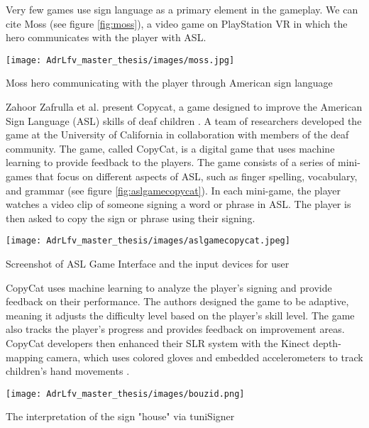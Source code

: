 Very few games use sign language as a primary element in the gameplay. We can cite Moss \cite{moss2018} (see figure \ref{fig:moss}), a video game on PlayStation VR in which the hero communicates with the player with ASL. 

\begin{marginfigure}
    \centering
    \texttt{[image: AdrLfv\_master\_thesis/images/moss.jpg]}
    \caption{Moss hero communicating with the player through American sign language}
    \label{fig:moss}
\end{marginfigure}

Zahoor Zafrulla et al. present Copycat, a game designed to improve the American Sign Language (ASL) skills of deaf children \cite{zafrulla2011copycat}. A team of researchers developed the game at the University of California in collaboration with members of the deaf community.
The game, called CopyCat, is a digital game that uses machine learning to provide feedback to the players. The game consists of a series of mini-games that focus on different aspects of ASL, such as finger spelling, vocabulary, and grammar (see figure \ref{fig:aslgamecopycat}). In each mini-game, the player watches a video clip of someone signing a word or phrase in ASL. The player is then asked to copy the sign or phrase using their signing.

\begin{marginfigure}
    \centering
    \texttt{[image: AdrLfv\_master\_thesis/images/aslgamecopycat.jpeg]}
    \caption{Screenshot of ASL Game Interface and the input devices for user  }
    \label{fig:aslgamecopycat}
\end{marginfigure}

CopyCat uses machine learning to analyze the player's signing and provide feedback on their performance. The authors designed the game to be adaptive, meaning it adjusts the difficulty level based on the player's skill level. The game also tracks the player's progress and provides feedback on improvement areas.
CopyCat developers then enhanced their SLR system with the Kinect depth-mapping camera, which uses colored gloves and embedded accelerometers to track children's hand movements \cite{zafrulla2011american}.

\begin{marginfigure}
    \centering
    \texttt{[image: AdrLfv\_master\_thesis/images/bouzid.png]}
    \caption{The interpretation of the sign "house" via tuniSigner}
    \label{fig:bouzid}
\end{marginfigure}

